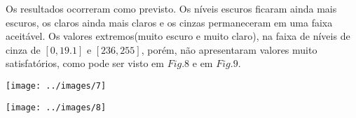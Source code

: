 \documentclass[conference]{IEEEtran}
\begin{document}
 			\vspace{2\baselineskip}\vspace{-\parskip}		 		
 			\vspace{2\baselineskip}\vspace{-\parskip}		 						 						 						 		\vspace{2\baselineskip}\vspace{-\parskip}	
		 	\vspace{2\baselineskip}\vspace{-\parskip}				 			
		 	\vspace{2\baselineskip}\vspace{-\parskip}		 									\vspace{2\baselineskip}\vspace{-\parskip}				 				 	Os resultados ocorreram como previsto. Os n\'iveis escuros ficaram ainda mais escuros, os claros ainda mais claros e os cinzas permaneceram em uma faixa aceit\'avel. Os valores extremos(muito escuro e muito claro), na faixa de n\'iveis de cinza de $[0,19.1]$ e $[236,255]$, por\'em, n\~ao apresentaram valores muito satisfat\'orios, como pode ser visto em $Fig.8$ e em $Fig.9$. 	
		 	\vspace{2\baselineskip}\vspace{-\parskip}	
		 	\vspace{2\baselineskip}\vspace{-\parskip}		 		
		\vspace{2\baselineskip}\vspace{-\parskip}
		\begin{minipage}{\linewidth}
  		\centering
  		\texttt{[image: ../images/7]}
		\end{minipage}	
	
	\vspace{2\baselineskip}\vspace{-\parskip}	
	\vspace{2\baselineskip}\vspace{-\parskip}	
		\begin{minipage}{\linewidth}
  		\centering
  		\texttt{[image: ../images/8]}
		\end{minipage}
		
		\vspace{2\baselineskip}\vspace{-\parskip}	
		\vspace{2\baselineskip}\vspace{-\parskip}	
		
\end{document}
